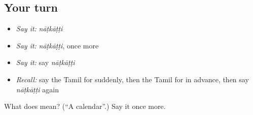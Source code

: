 \subsection*{Your turn}
\begin{itemize}
\raggedright
  \item \emph{Say it:} \emph{nāṭkāṭṭi}
  \item \emph{Say it:} \emph{nāṭkāṭṭi}, once more
  \item \emph{Say it:} say \emph{nāṭkāṭṭi}
  \item \emph{Recall:} say the Tamil for suddenly, then the Tamil for in advance, then say \emph{nāṭkāṭṭi} again
\end{itemize}

\begin{tcolorbox}[breakable,colback=teal!4,colframe=teal!35!black,title={Before you move on}]
What does  mean? (\textquotedblleft{}A calendar\textquotedblright{}.) Say it once more.
\end{tcolorbox}
